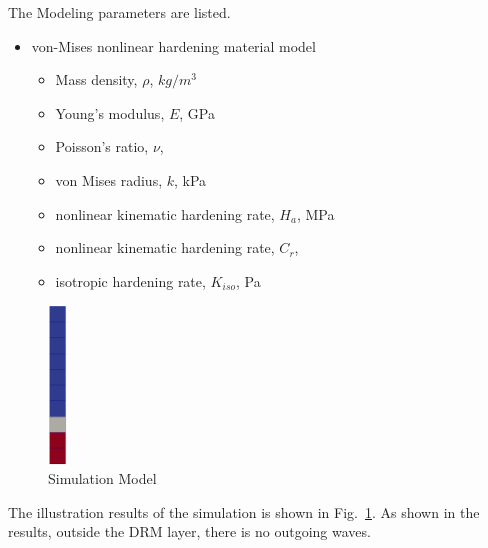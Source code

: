 The Modeling parameters are listed.
\begin{itemize}
  \item von-Mises nonlinear hardening material model 
  \begin{itemize}
    \item Mass density, $\rho$, \enspace {} $kg/m^3$
    \item Young's modulus, $E$, \enspace {} GPa
    \item Poisson's ratio, $\nu$, \enspace {}
    \item von Mises radius, $k$, \enspace {} kPa
    \item nonlinear kinematic hardening rate, $H_a$, \enspace {} MPa
    \item nonlinear kinematic hardening rate, $C_r$, \enspace {}
    \item isotropic hardening rate, $K_{iso}$, \enspace {} Pa
  \end{itemize}
\end{itemize}





\begin{figure}[H]
  \centering
  \includegraphics[width = 0.5cm]{./Figure-files/nonlinear_analysis_steps/free_field_1D/overview.png}
  \caption{Simulation Model}
  \label{fig_decon_1D_motion_1D_model}
\end{figure}

The illustration results of the simulation is shown in Fig.~\ref{fig_decon_1D_motion_1D_model}.
As shown in the results, outside the DRM layer, there is no outgoing waves. 

